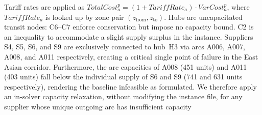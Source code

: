 \begin{tcolorbox}[notebox, title={Modelling Notes}]
\small
Tariff rates are applied as $TotalCost_a^p = (1+TariffRate_a)\cdot VarCost_a^p$,
where $TariffRate_a$ is looked up by zone pair $(z_{\mathrm{from}}, z_{\mathrm{to}})$.
Hubs are uncapacitated transit nodes: C6--C7 enforce conservation but impose no
capacity bound. C2 is an inequality to accommodate a slight supply surplus in the instance.
Suppliers S4, S5, S6, and S9 are exclusively connected to hub~H3
via arcs A006, A007, A008, and A011 respectively, creating a critical
single point of failure in the East Asian corridor. Furthermore, the
arc capacities of A008 (451 units) and A011 (403 units) fall below
the individual supply of S6 and S9 (741 and 631 units respectively),
rendering the baseline infeasible as formulated. 
We therefore apply an in-solver capacity relaxation, without modifying the instance file, for any supplier whose unique outgoing arc has insufficient capacity
\end{tcolorbox}
